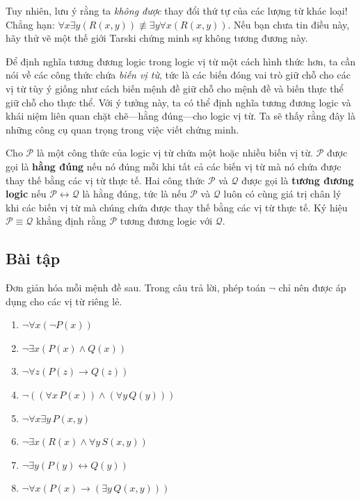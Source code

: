 \begin{warningbox}
Tuy nhiên, lưu ý rằng ta \textit{không được} thay đổi thứ tự của các lượng từ khác loại! Chẳng hạn: $\forall x \exists y(R(x,y)) \not\equiv \exists y \forall x(R(x,y))$. Nếu bạn chưa tin điều này, hãy thử vẽ một thế giới Tarski chứng minh sự không tương đương này.
\end{warningbox}

Để định nghĩa tương đương logic trong logic vị từ một cách hình thức hơn, ta cần nói về các công thức chứa \textit{biến vị từ}, tức là các biến đóng vai trò giữ chỗ cho các vị từ tùy ý giống như cách biến mệnh đề giữ chỗ cho mệnh đề và biến thực thể giữ chỗ cho thực thể. Với ý tưởng này, ta có thể định nghĩa tương đương logic và khái niệm liên quan chặt chẽ---hằng đúng---cho logic vị từ. Ta sẽ thấy rằng đây là những công cụ quan trọng trong việc viết chứng minh.

\begin{definition}
Cho $\mathcal{P}$ là một công thức của logic vị từ chứa một hoặc nhiều biến vị từ. $\mathcal{P}$ được gọi là \textbf{hằng đúng} nếu nó đúng mỗi khi tất cả các biến vị từ mà nó chứa được thay thế bằng các vị từ thực tế. Hai công thức $\mathcal{P}$ và $\mathcal{Q}$ được gọi là \textbf{tương đương logic} nếu $\mathcal{P} \leftrightarrow \mathcal{Q}$ là hằng đúng, tức là nếu $\mathcal{P}$ và $\mathcal{Q}$ luôn có cùng giá trị chân lý khi các biến vị từ mà chúng chứa được thay thế bằng các vị từ thực tế. Ký hiệu $\mathcal{P} \equiv \mathcal{Q}$ khẳng định rằng $\mathcal{P}$ tương đương logic với $\mathcal{Q}$.
\end{definition}

\subsection*{Bài tập}

\begin{exercise}
Đơn giản hóa mỗi mệnh đề sau. Trong câu trả lời, phép toán $\neg$ chỉ nên được áp dụng cho các vị từ riêng lẻ.
\begin{enumerate}[label=\alph*)]
\item $\neg \forall x(\neg P(x))$
\item $\neg \exists x(P(x) \land Q(x))$
\item $\neg \forall z(P(z) \to Q(z))$
\item $\neg((\forall x\, P(x)) \land (\forall y\, Q(y)))$
\item $\neg \forall x \exists y\, P(x,y)$
\item $\neg \exists x(R(x) \land \forall y\, S(x,y))$
\item $\neg \exists y(P(y) \leftrightarrow Q(y))$
\item $\neg \forall x(P(x) \to (\exists y\, Q(x,y)))$
\end{enumerate}
\end{exercise}

